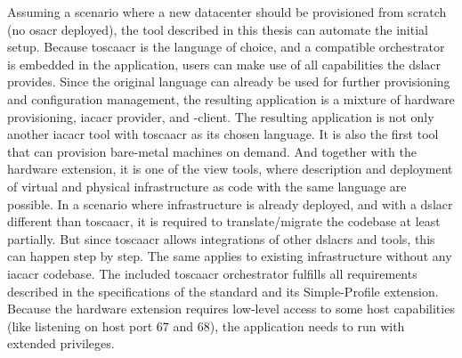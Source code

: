 Assuming a scenario where a new datacenter should be provisioned from scratch (no \gls{osacr} deployed), the tool described in this thesis can automate the initial setup. Because \gls{toscaacr} is the language of choice, and a compatible orchestrator is embedded in the application, users can make use of all capabilities the \gls{dslacr} provides. Since the original language can already be used for further provisioning and configuration management, the resulting application is a mixture of hardware provisioning, \gls{iacacr} provider, and -client.
\newline
The resulting application is not only another \gls{iacacr} tool with \gls{toscaacr} as its chosen language. It is also the first tool that can provision bare-metal machines on demand. And together with the hardware extension, it is one of the view tools, where description and deployment of virtual and physical infrastructure as code with the same language are possible.
\newline
In a scenario where infrastructure is already deployed, and with a \gls{dslacr} different than \gls{toscaacr}, it is required to translate/migrate the codebase at least partially. But since \gls{toscaacr} allows integrations of other \gls{dslacr}s and tools, this can happen step by step. The same applies to existing infrastructure without any \gls{iacacr} codebase.
\newline\smallskip
The included \gls{toscaacr} orchestrator fulfills all requirements described in the specifications of the standard and its Simple-Profile extension. Because the hardware extension requires low-level access to some host capabilities (like listening on host port 67 and 68), the application needs to run with extended privileges.



